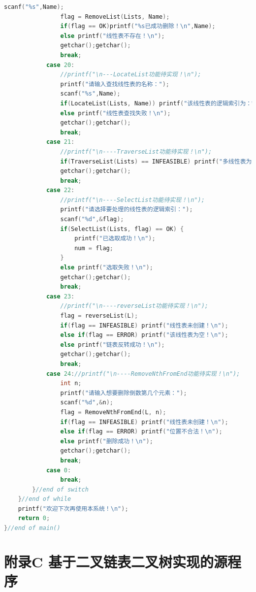 \documentclass[supercite]{Experimental_Report}
\theoremstyle{definition}
\begin{document}
\begin{lstlisting}[language=c]
                scanf("%s",Name);
                flag = RemoveList(Lists, Name);
                if(flag == OK)printf("%s已成功删除！\n",Name);
                else printf("线性表不存在！\n");
                getchar();getchar();
                break;
            case 20:
                //printf("\n---LocateList功能待实现！\n");
                printf("请输入查找线性表的名称：");
                scanf("%s",Name);
                if(LocateList(Lists, Name)) printf("该线性表的逻辑索引为：%d\n", LocateList(Lists, Name));
                else printf("线性表查找失败！\n");
                getchar();getchar();
                break;
            case 21:
                //printf("\n----TraverseList功能待实现！\n");
                if(TraverseList(Lists) == INFEASIBLE) printf("多线性表为空！\n");
                getchar();getchar();
                break;
            case 22:
                //printf("\n----SelectList功能待实现！\n");
                printf("请选择要处理的线性表的逻辑索引：");
                scanf("%d",&flag);
                if(SelectList(Lists, flag) == OK) {
                    printf("已选取成功！\n");
                    num = flag;
                }
                else printf("选取失败！\n");
                getchar();getchar();
                break;
            case 23:
                //printf("\n----reverseList功能待实现！\n");
                flag = reverseList(L);
                if(flag == INFEASIBLE) printf("线性表未创建！\n");
                else if(flag == ERROR) printf("该线性表为空！\n");
                else printf("链表反转成功！\n");
                getchar();getchar();
                break;
            case 24://printf("\n----RemoveNthFromEnd功能待实现！\n");
                int n;
                printf("请输入想要删除倒数第几个元素：");
                scanf("%d",&n);
                flag = RemoveNthFromEnd(L, n);
                if(flag == INFEASIBLE) printf("线性表未创建！\n");
                else if(flag == ERROR) printf("位置不合法！\n");
                else printf("删除成功！\n");
                getchar();getchar();
                break;
            case 0:
                break;
        }//end of switch
    }//end of while
    printf("欢迎下次再使用本系统！\n");
    return 0;
}//end of main()

\end{lstlisting}

\newpage
\section{附录C 基于二叉链表二叉树实现的源程序}
\end{document}
